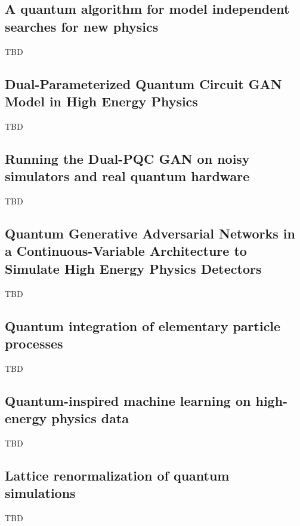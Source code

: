 \subsection{A quantum algorithm for model independent searches for new physics~\cite{Matchev:2020wwx}}
TBD
\subsection{Dual-Parameterized Quantum Circuit GAN Model in High Energy Physics~\cite{Chang:2021ufg}}
TBD
\subsection{Running the Dual-PQC GAN on noisy simulators and real quantum hardware~\cite{Chang:2022dxc}}
TBD
\subsection{Quantum Generative Adversarial Networks in a Continuous-Variable Architecture to Simulate High Energy Physics Detectors~\cite{Chang:2021jne}}
TBD
\subsection{Quantum integration of elementary particle processes~\cite{Agliardi:2022ghn}}
TBD
\subsection{Quantum-inspired machine learning on high-energy physics data~\cite{Felser:2020mka}}
TBD
\subsection{Lattice renormalization of quantum simulations~\cite{Carena:2021ltu}}
TBD


